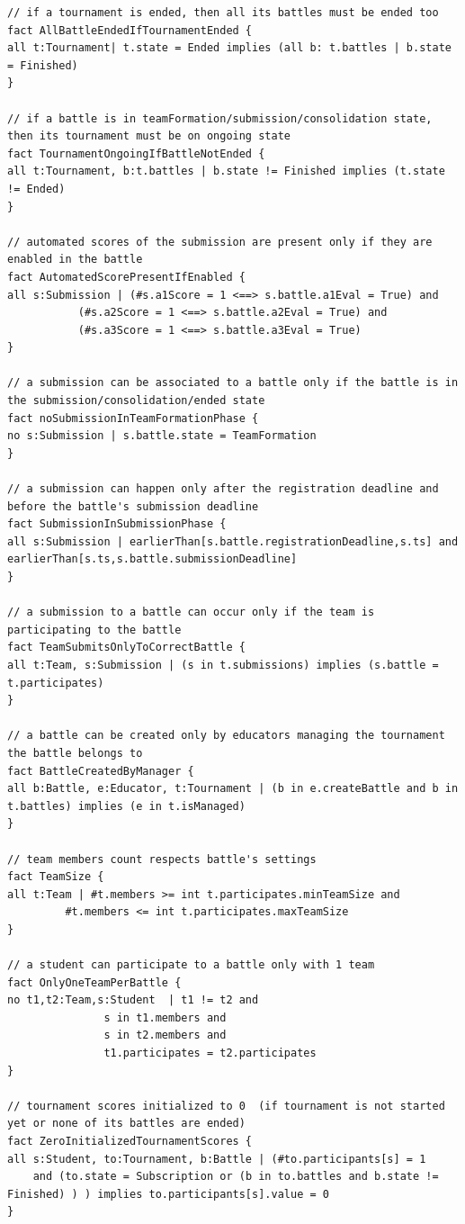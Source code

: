 \begin{lstlisting}[language=alloy]
// if a tournament is ended, then all its battles must be ended too
fact AllBattleEndedIfTournamentEnded {
all t:Tournament| t.state = Ended implies (all b: t.battles | b.state = Finished)
}

// if a battle is in teamFormation/submission/consolidation state, then its tournament must be on ongoing state
fact TournamentOngoingIfBattleNotEnded {
all t:Tournament, b:t.battles | b.state != Finished implies (t.state != Ended)
}

// automated scores of the submission are present only if they are enabled in the battle
fact AutomatedScorePresentIfEnabled {
all s:Submission | (#s.a1Score = 1 <==> s.battle.a1Eval = True) and
		   (#s.a2Score = 1 <==> s.battle.a2Eval = True) and
		   (#s.a3Score = 1 <==> s.battle.a3Eval = True) 
}

// a submission can be associated to a battle only if the battle is in the submission/consolidation/ended state 
fact noSubmissionInTeamFormationPhase {
no s:Submission | s.battle.state = TeamFormation
}

// a submission can happen only after the registration deadline and before the battle's submission deadline
fact SubmissionInSubmissionPhase {
all s:Submission | earlierThan[s.battle.registrationDeadline,s.ts] and earlierThan[s.ts,s.battle.submissionDeadline]
}

// a submission to a battle can occur only if the team is participating to the battle
fact TeamSubmitsOnlyToCorrectBattle {
all t:Team, s:Submission | (s in t.submissions) implies (s.battle = t.participates)
}

// a battle can be created only by educators managing the tournament the battle belongs to
fact BattleCreatedByManager {
all b:Battle, e:Educator, t:Tournament | (b in e.createBattle and b in t.battles) implies (e in t.isManaged)
}

// team members count respects battle's settings
fact TeamSize {
all t:Team | #t.members >= int t.participates.minTeamSize and
	     #t.members <= int t.participates.maxTeamSize
}

// a student can participate to a battle only with 1 team
fact OnlyOneTeamPerBattle {
no t1,t2:Team,s:Student  | t1 != t2 and
			   s in t1.members and
			   s in t2.members and
			   t1.participates = t2.participates
}

// tournament scores initialized to 0  (if tournament is not started yet or none of its battles are ended)
fact ZeroInitializedTournamentScores {
all s:Student, to:Tournament, b:Battle | (#to.participants[s] = 1 
	and (to.state = Subscription or (b in to.battles and b.state != Finished) ) ) implies to.participants[s].value = 0
}


\end{lstlisting}
